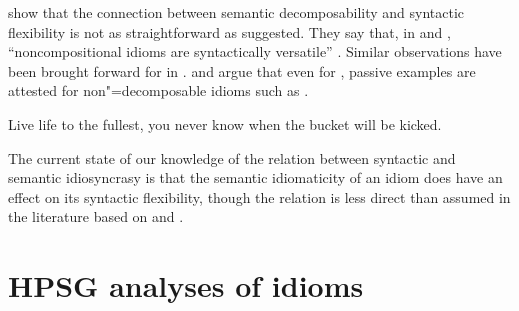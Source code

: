 \documentclass[output=paper
	        ,collection
	        ,collectionchapter
 	        ,biblatex
                ,babelshorthands
                ,newtxmath
                ,draftmode
                ,colorlinks, citecolor=brown
]{langscibook}
\begin{document}





\citet[511--514]{NSW94a} show that the connection between semantic decomposability and syntactic flexibility is not as straightforward as suggested. They say that, in  and , ``noncompositional idioms  are syntactically versatile'' \citep[514]{NSW94a}. Similar observations have been brought forward for  in \citet{Ruwet:91}. 
\citet{Bargmann:Sailer:18} and \cite{Fellbaum:19} argue that even for , passive examples are attested for non"=decomposable idioms such as .

\ea 
Live life to the fullest, you never know when the bucket will be kicked. \citep[756]{Fellbaum:19}\label{ex-kick-fellbaum}
\z 

The current state of our knowledge of the relation between syntactic and semantic idiosyncrasy is that the semantic idiomaticity of an idiom does have an effect on its syntactic flexibility, though the relation is less direct than assumed in the literature based on \cite{WSN84a-u} and \cite{NSW94a}.


\section{HPSG analyses of idioms}
\label{Sec-Analyses}

\end{document}
